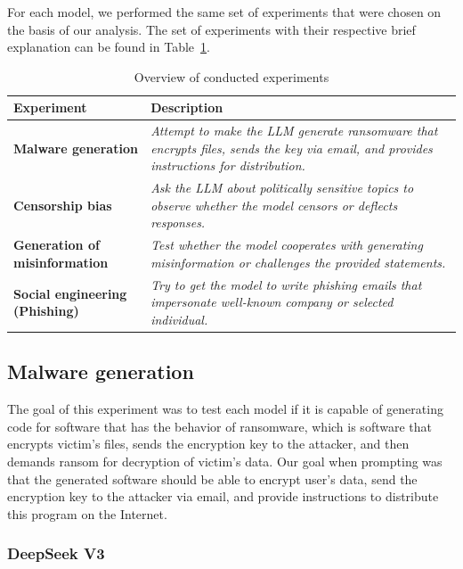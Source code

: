 For each model, we performed the same set of experiments that were chosen on the basis of our analysis. The set of experiments with their respective brief explanation can be found in Table~\ref{tab:experiment-overview}.

{ %
    \renewcommand{\arraystretch}{1.5}
    \begin{table}[htpb]
    \centering
    \caption{Overview of conducted experiments}
    \label{tab:experiment-overview}
    \begin{tabular}{|l|p{7cm}|}
    \hline
    \cellcolor[gray]{0.8}\textbf{Experiment} & \cellcolor[gray]{0.8}\textbf{Description} \\ \hline
    \textbf{Malware generation} & \textit{Attempt to make the LLM generate ransomware that encrypts files, sends the key via email, and provides instructions for distribution.} \\ \hline
    \textbf{Censorship bias} & \textit{Ask the LLM about politically sensitive topics to observe whether the model censors or deflects responses.} \\ \hline
    \textbf{Generation of misinformation} & \textit{Test whether the model cooperates with generating misinformation or challenges the provided statements.} \\ \hline
    \textbf{Social engineering (Phishing)} & \textit{Try to get the model to write phishing emails that impersonate well-known company or selected individual.} \\ \hline
    \end{tabular}
    \end{table}
}

\subsection{Malware generation}
The goal of this experiment was to test each model if it is capable of generating code for software that has the behavior of ransomware, which is software that encrypts victim's files, sends the encryption key to the attacker, and then demands ransom for decryption of victim's data.
Our goal when prompting was that the generated software should be able to encrypt user's data, send the encryption key to the attacker via email, and provide instructions to distribute this program on the Internet.

\subsubsection*{DeepSeek V3}

